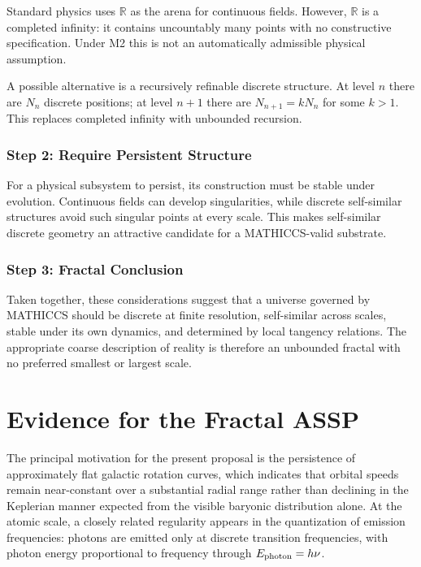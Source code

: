 \documentclass[11pt,a4paper]{article}
\begin{document}
Standard physics uses $\mathbb{R}$ as the arena for continuous fields. However, $\mathbb{R}$ is a completed infinity: it contains uncountably many points with no constructive specification. Under M2 this is not an automatically admissible physical assumption.

A possible alternative is a recursively refinable discrete structure. At level $n$ there are $N_n$ discrete positions; at level $n+1$ there are $N_{n+1}=kN_n$ for some $k>1$. This replaces completed infinity with unbounded recursion.

\subsubsection{Step 2: Require Persistent Structure}

For a physical subsystem to persist, its construction must be stable under evolution. Continuous fields can develop singularities, while discrete self-similar structures avoid such singular points at every scale. This makes self-similar discrete geometry an attractive candidate for a MATHICCS-valid substrate.

\subsubsection{Step 3: Fractal Conclusion}

Taken together, these considerations suggest that a universe governed by MATHICCS should be discrete at finite resolution, self-similar across scales, stable under its own dynamics, and determined by local tangency relations. The appropriate coarse description of reality is therefore an unbounded fractal with no preferred smallest or largest scale.


\section{Evidence for the Fractal ASSP}

The principal motivation for the present proposal is the persistence of approximately flat galactic rotation curves, which indicates that orbital speeds remain near-constant over a substantial radial range rather than declining in the Keplerian manner expected from the visible baryonic distribution alone. At the atomic scale, a closely related regularity appears in the quantization of emission frequencies: photons are emitted only at discrete transition frequencies, with photon energy proportional to frequency through $E_{\rm photon}=h\nu$.
\end{document}

